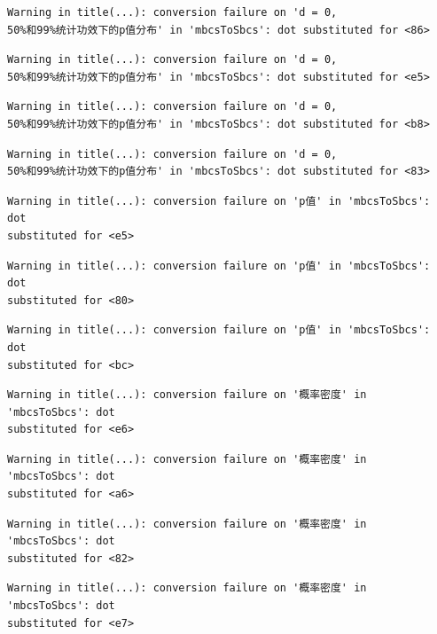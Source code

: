 \documentclass[
  letterpaper,
  DIV=11,
  numbers=noendperiod]{scrreprt}
\begin{document}
\begin{verbatim}
Warning in title(...): conversion failure on 'd = 0,
50%和99%统计功效下的p值分布' in 'mbcsToSbcs': dot substituted for <86>
\end{verbatim}

\begin{verbatim}
Warning in title(...): conversion failure on 'd = 0,
50%和99%统计功效下的p值分布' in 'mbcsToSbcs': dot substituted for <e5>
\end{verbatim}

\begin{verbatim}
Warning in title(...): conversion failure on 'd = 0,
50%和99%统计功效下的p值分布' in 'mbcsToSbcs': dot substituted for <b8>
\end{verbatim}

\begin{verbatim}
Warning in title(...): conversion failure on 'd = 0,
50%和99%统计功效下的p值分布' in 'mbcsToSbcs': dot substituted for <83>
\end{verbatim}

\begin{verbatim}
Warning in title(...): conversion failure on 'p值' in 'mbcsToSbcs': dot
substituted for <e5>
\end{verbatim}

\begin{verbatim}
Warning in title(...): conversion failure on 'p值' in 'mbcsToSbcs': dot
substituted for <80>
\end{verbatim}

\begin{verbatim}
Warning in title(...): conversion failure on 'p值' in 'mbcsToSbcs': dot
substituted for <bc>
\end{verbatim}

\begin{verbatim}
Warning in title(...): conversion failure on '概率密度' in 'mbcsToSbcs': dot
substituted for <e6>
\end{verbatim}

\begin{verbatim}
Warning in title(...): conversion failure on '概率密度' in 'mbcsToSbcs': dot
substituted for <a6>
\end{verbatim}

\begin{verbatim}
Warning in title(...): conversion failure on '概率密度' in 'mbcsToSbcs': dot
substituted for <82>
\end{verbatim}

\begin{verbatim}
Warning in title(...): conversion failure on '概率密度' in 'mbcsToSbcs': dot
substituted for <e7>
\end{verbatim}
\end{document}
